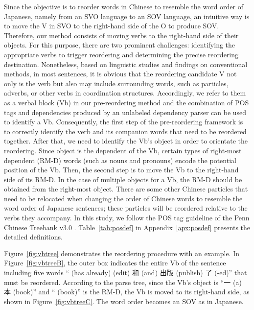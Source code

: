 \documentclass[english]{jnlp_1.4}
\begin{document}
Since the objective is to reorder words in Chinese to resemble the word order of 
Japanese, namely from an SVO language to an SOV language, an intuitive way is to 
move the V in SVO to the right-hand side of the O to produce SOV. Therefore, our method 
consists of moving verbs to the right-hand side of their objects. For this purpose, 
there are two prominent challenges: identifying the appropriate verbs to 
trigger reordering and determining the precise reordering destination. 
Nonetheless, based on linguistic studies and findings on conventional methods, 
in most sentences, it is obvious that the reordering candidate V not only is the verb 
but also may include surrounding words, such as particles, adverbs, or other 
verbs in coordination structures. Accordingly, we refer to them as a verbal block 
(Vb) in our pre-reordering method and the combination of POS tags and dependencies 
produced by an unlabeled dependency parser can be used to identify a Vb. Consequently, 
the first step of the pre-reordering framework is to correctly identify the verb 
and its companion words that need to be reordered together. 
After that, we need to identify the Vb's object in order to orientate the reordering. 
Since object is the dependent of the Vb, certain types of right-most dependent (RM-D) 
words (such as nouns and pronouns) encode the potential position of the Vb. Then, the second 
step is to move the Vb to the right-hand side of its RM-D. In the case of multiple 
objects for a Vb, the RM-D should be obtained from the right-most object.
There are some other Chinese particles that need to be relocated when
changing the order of Chinese words to resemble the word order of Japanese sentences; these particles will be 
reordered relative to the verbs they accompany. In this study, we follow the POS tag guideline of 
the Penn Chinese Treebank v3.0 . Table~\ref{tab:posdef} in 
Appendix~\ref{apx:posdef} presents the detailed definitions.

Figure~\ref{fig:vbtree} demonstrates the reordering procedure with an example. 
In Figure~\ref{fig:vbtreeB}, the outer box indicates the entire Vb of the sentence 
including five words `` (has already)  (edit) 和 (and) 出版 (publish) 
了 (-ed)'' that must be reordered. According to the parse tree, since 
the Vb's object is ``一 (a) 本  (book)'' and `` (book)'' is the RM-D, the Vb is moved to its
right-hand side, as shown in Figure~\ref{fig:vbtreeC}. The word order becomes an SOV as in Japanese.
\end{document}
